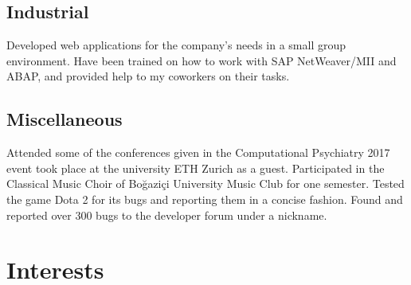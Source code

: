 \documentclass[11pt,a4paper,sans]{moderncv}
\begin{document}
\vspace{2ex}

\subsection{Industrial}
	{}{Developed web applications for the company's needs in a small group environment.}
	{}{Have been trained on how to work with SAP NetWeaver/MII and ABAP, and provided help to my coworkers on their tasks.}

\vspace{2ex}

\subsection{Miscellaneous}
	{}{Attended some of the conferences given in the Computational Psychiatry 2017 event took place at the university ETH Zurich as a guest.}
	{}{Participated in the Classical Music Choir of Boğaziçi University Music Club for one semester.}
	{}{Tested the game Dota 2 for its bugs and reporting them in a concise fashion.
	\newline{}Found and reported over 300 bugs to the developer forum under a nickname.}

\vspace{4ex}

\section{Interests}


\end{document}
